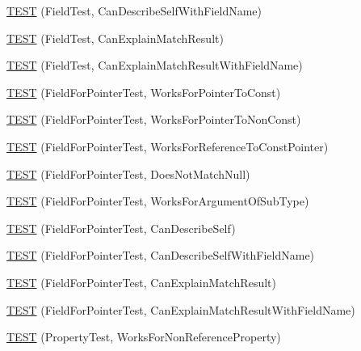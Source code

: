 \begin{DoxyCompactItemize}
\item 
\mbox{\hyperlink{namespacetesting_1_1gmock__matchers__test_a37d3ea6fde3a814c788ecddead6b9828}{T\+E\+ST}} (Field\+Test, Can\+Describe\+Self\+With\+Field\+Name)
\item 
\mbox{\hyperlink{namespacetesting_1_1gmock__matchers__test_ae1279ce8e2a3a6c6f0d4dbe436c9da02}{T\+E\+ST}} (Field\+Test, Can\+Explain\+Match\+Result)
\item 
\mbox{\hyperlink{namespacetesting_1_1gmock__matchers__test_aaeb4a7641ecabdb39710c56321000e47}{T\+E\+ST}} (Field\+Test, Can\+Explain\+Match\+Result\+With\+Field\+Name)
\item 
\mbox{\hyperlink{namespacetesting_1_1gmock__matchers__test_af5c12cdd12f8778074ad0714b83858ed}{T\+E\+ST}} (Field\+For\+Pointer\+Test, Works\+For\+Pointer\+To\+Const)
\item 
\mbox{\hyperlink{namespacetesting_1_1gmock__matchers__test_ac339a26bf6100a2eb2dd4bf908f8448c}{T\+E\+ST}} (Field\+For\+Pointer\+Test, Works\+For\+Pointer\+To\+Non\+Const)
\item 
\mbox{\hyperlink{namespacetesting_1_1gmock__matchers__test_a603253edc7a2310c8a1db225cb589a99}{T\+E\+ST}} (Field\+For\+Pointer\+Test, Works\+For\+Reference\+To\+Const\+Pointer)
\item 
\mbox{\hyperlink{namespacetesting_1_1gmock__matchers__test_a06a1c8d949707ab606627e9f6efe87b9}{T\+E\+ST}} (Field\+For\+Pointer\+Test, Does\+Not\+Match\+Null)
\item 
\mbox{\hyperlink{namespacetesting_1_1gmock__matchers__test_a5447541a290e16a81aec6dd975983d57}{T\+E\+ST}} (Field\+For\+Pointer\+Test, Works\+For\+Argument\+Of\+Sub\+Type)
\item 
\mbox{\hyperlink{namespacetesting_1_1gmock__matchers__test_a056670af8fc7bd3dfd170435dbf08c3c}{T\+E\+ST}} (Field\+For\+Pointer\+Test, Can\+Describe\+Self)
\item 
\mbox{\hyperlink{namespacetesting_1_1gmock__matchers__test_ac1ff62c6b02c5267c3437c72f62bc8c7}{T\+E\+ST}} (Field\+For\+Pointer\+Test, Can\+Describe\+Self\+With\+Field\+Name)
\item 
\mbox{\hyperlink{namespacetesting_1_1gmock__matchers__test_a6a4ffd283f91f4e085aa582aedefe38e}{T\+E\+ST}} (Field\+For\+Pointer\+Test, Can\+Explain\+Match\+Result)
\item 
\mbox{\hyperlink{namespacetesting_1_1gmock__matchers__test_a1f0a8f314a858edb7144d2af8e8bdb66}{T\+E\+ST}} (Field\+For\+Pointer\+Test, Can\+Explain\+Match\+Result\+With\+Field\+Name)
\item 
\mbox{\hyperlink{namespacetesting_1_1gmock__matchers__test_a9c42c3b244c7b4d63040e469d5b31e1e}{T\+E\+ST}} (Property\+Test, Works\+For\+Non\+Reference\+Property)

\end{DoxyCompactItemize}
